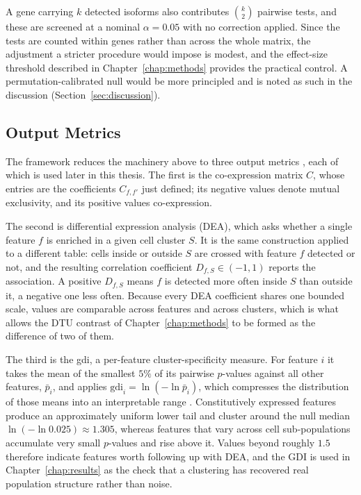 A gene carrying $k$ detected isoforms also contributes $\binom{k}{2}$ pairwise tests, and these are screened at a nominal $\alpha = 0.05$ with no correction applied. Since the tests are counted within genes rather than across the whole matrix, the adjustment a stricter procedure would impose is modest, and the effect-size threshold described in Chapter~\ref{chap:methods} provides the practical control. A permutation-calibrated null would be more principled and is noted as such in the discussion (Section~\ref{sec:discussion}).

\subsection{Output Metrics}

The framework reduces the machinery above to three output metrics \cite{galfre2021cotan}, each of which is used later in this thesis. The first is the co-expression matrix $C$, whose entries are the coefficients $C_{f,f'}$ just defined; its negative values denote mutual exclusivity, and its positive values co-expression.

The second is differential expression analysis (DEA), which asks whether a single feature $f$ is enriched in a given cell cluster $S$. It is the same construction applied to a different table: cells inside or outside $S$ are crossed with feature $f$ detected or not, and the resulting correlation coefficient $D_{f,S} \in (-1, 1)$ reports the association. A positive $D_{f,S}$ means $f$ is detected more often inside $S$ than outside it, a negative one less often. Because every DEA coefficient shares one bounded scale, values are comparable across features and across clusters, which is what allows the DTU contrast of Chapter~\ref{chap:methods} to be formed as the difference of two of them.

The third is the \gls{gdi}, a per-feature cluster-specificity measure. For feature $i$ it takes the mean of the smallest $5\%$ of its pairwise $p$-values against all other features, $\bar{p}_i$, and applies $\mathrm{gdi}_i = \ln(-\ln \bar{p}_i)$, which compresses the distribution of those means into an interpretable range \cite{galfre2021cotan}. Constitutively expressed features produce an approximately uniform lower tail and cluster around the null median $\ln(-\ln 0.025) \approx 1.305$, whereas features that vary across cell sub-populations accumulate very small $p$-values and rise above it. Values beyond roughly $1.5$ therefore indicate features worth following up with DEA, and the GDI is used in Chapter~\ref{chap:results} as the check that a clustering has recovered real population structure rather than noise.

